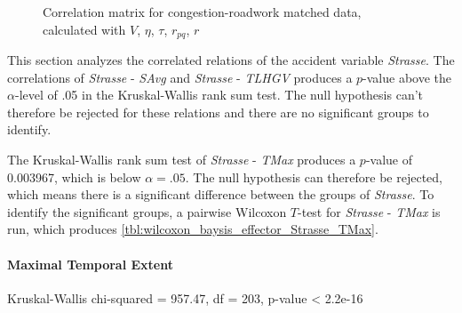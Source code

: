 \begin{figure}[!ht]
	\centering
	\caption{Correlation matrix for congestion-roadwork matched data, calculated with $V$, $\eta$, $\tau$, $r_{pq}$, $r$}
	\label{img:correlation_matrix_arbis_selected_effector_cramers}
\end{figure}

This section analyzes the correlated relations of the accident variable \textit{Strasse}. The correlations of \textit{Strasse} - \textit{SAvg} and \textit{Strasse} - \textit{TLHGV} produces a $p$-value above the $\alpha$-level of .05 in the Kruskal-Wallis rank sum test. The null hypothesis can't therefore be rejected for these relations and there are no significant groups to identify.

The Kruskal-Wallis rank sum test of \textit{Strasse} - \textit{TMax} produces a $p$-value of 0.003967, which is below $\alpha=.05$. The null hypothesis can therefore be rejected, which means there is a significant difference between the groups of \textit{Strasse}. To identify the significant groups, a pairwise Wilcoxon $T$-test for \textit{Strasse} - \textit{TMax} is run, which produces \cref{tbl:wilcoxon_baysis_effector_Strasse_TMax}. 


\paragraph{Maximal Temporal Extent}
Kruskal-Wallis chi-squared = 957.47, df = 203, p-value < 2.2e-16

